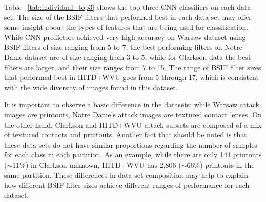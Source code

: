 Table ~\ref{tab:individual_top3} shows the top three CNN classifiers on each data set. The size of the BSIF filters that performed best in each data set may offer some insight about the types of features that are being used for classification. While CNN predictors achieved very high accuracy on Warsaw dataset using BSIF filters of size ranging from 5 to 7, the best performing filters on Notre Dame dataset are of size ranging from 3 to 5, while for Clarkson data the best filters are larger, and their size ranges from 7 to 15. The range of BSIF filter sizes that performed best in IIITD+WVU goes from 5 through 17, which is consistent with the wide diversity of images found in this dataset.

It is important to observe a basic difference in the datasets: while Warsaw attack images are printouts, Notre Dame's attack images are textured contact lenses. On the other hand, Clarkson and IIITD+WVU attack subsets are composed of a mix of textured contacts and printouts. Another fact that should be noted is that these data sets do not have similar proportions regarding the number of samples for each class in each partition. As an example, while there are only 144 printouts ($\sim11\%$) in Clarkson unknown, IIITD+WVU has 2,806 ($\sim66\%$) printouts in the same partition. These differences in data set composition may help to explain how different BSIF filter sizes achieve different ranges of performance for each dataset.


